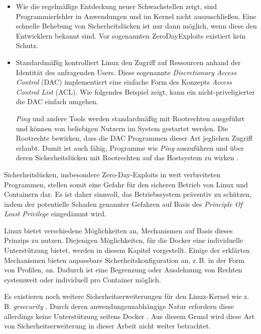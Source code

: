\documentclass[../main.tex]{subfiles}
\begin{document}
		\begin{itemize}
			\item	Wie die regelmäßige Entdeckung neuer Schwachstellen zeigt, sind Programmierfehler in Anwendungen und im Kernel nicht auszuschließen. Eine schnelle Behebung von Sicherheitslücken ist nur dann möglich, wenn diese den Entwicklern bekannt sind. Vor sogenannten \glspl{ZeroDayExploit} existiert kein Schutz.
			\item	Standardmäßig kontrolliert Linux den Zugriff auf Ressourcen anhand der Identität des anfragenden Users. Diese sogenannte \emph{Discretionary Access Control} (\acrshort{DAC}) implementiert eine einfache Form des Konzepts \emph{Access Control List} (\acrshort{ACL}). Wie folgendes Beispiel zeigt, kann ein nicht-priveligierter \cbroken{} die DAC einfach umgehen.

			\emph{Ping} und andere Tools werden standardmäßig mit Rootrechten ausgeführt und können von beliebigen Nutzern im System gestartet werden. Die Rootrechte bewirken, dass die DAC Programmen dieser Art jeglichen Zugriff erlaubt. Damit ist auch \cbroken{} fähig, Programme wie \emph{Ping} auszuführen und über deren Sicherheitslücken mit Rootrechten auf das Hostsystem zu wirken \cite[S.26]{SELinuxApparmor}.
		\end{itemize}

		Sicherheitslücken, insbesondere Zero-Day-Exploits in weit verbreiteten Programmen, stellen somit eine Gefahr für den sicheren Betrieb von Linux und Containern dar. Es ist daher sinnvoll, das Betriebssystem präventiv zu schützen, indem der potentielle Schaden genannter Gefahren auf Basis des \emph{Principle Of Least Privilege} eingedämmt wird.

		Linux bietet verschiedene Möglichkeiten an, Mechanismen auf Basis dieses Prinzips zu nutzen. Diejenigen Möglichkeiten, für die Docker eine individuelle Unterstützung bietet, werden in diesem Kapitel vorgestellt. Einige der erklärten Mechanismen bieten anpassbare Sicherheitskonfiguration an, z.\,B. in der Form von Profilen, an. Dadurch ist eine Begrenzung oder Ausdehnung von Rechten systemweit oder individuell pro Container möglich.

		Es existieren noch weitere Sicherheitserweiterungen für den Linux-Kernel wie z.\,B. \emph{grsecurity} \cite{grsecurity}. Durch deren anwendungsunabhängige Natur erfordern diese allerdings keine Unterstützung seitens Docker \cite{dockerSecurity}. Aus diesem Grund wird diese Art von Sicherheitserweiterung in dieser Arbeit nicht weiter betrachtet.
\end{document}
